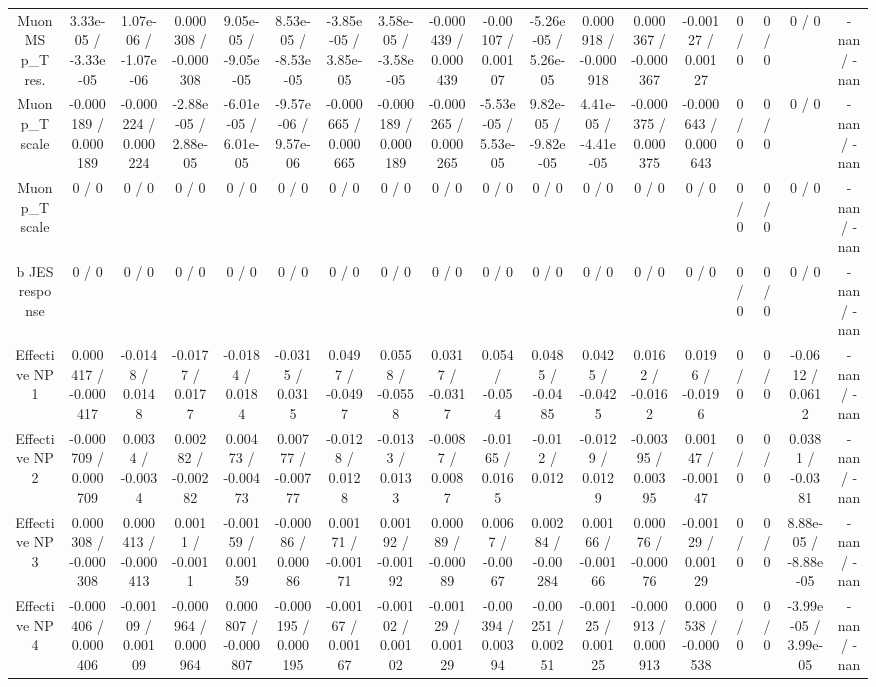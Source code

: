 \documentclass[10pt]{article}
\begin{document}
\begin{table}[htbp]
\begin{center}
\begin{tabular}{|c|c|c|c|c|c|c|c|c|c|c|c|c|c|c|c|c|c|}
  Muon MS p_{T} res. & 3.33e-05 / -3.33e-05 & 1.07e-06 / -1.07e-06 & 0.000308 / -0.000308 & 9.05e-05 / -9.05e-05 & 8.53e-05 / -8.53e-05 & -3.85e-05 / 3.85e-05 & 3.58e-05 / -3.58e-05 & -0.000439 / 0.000439 & -0.00107 / 0.00107 & -5.26e-05 / 5.26e-05 & 0.000918 / -0.000918 & 0.000367 / -0.000367 & -0.00127 / 0.00127 & 0 / 0 & 0 / 0 & 0 / 0 & -nan / -nan \\ 
  Muon p_{T} scale & -0.000189 / 0.000189 & -0.000224 / 0.000224 & -2.88e-05 / 2.88e-05 & -6.01e-05 / 6.01e-05 & -9.57e-06 / 9.57e-06 & -0.000665 / 0.000665 & -0.000189 / 0.000189 & -0.000265 / 0.000265 & -5.53e-05 / 5.53e-05 & 9.82e-05 / -9.82e-05 & 4.41e-05 / -4.41e-05 & -0.000375 / 0.000375 & -0.000643 / 0.000643 & 0 / 0 & 0 / 0 & 0 / 0 & -nan / -nan \\ 
  Muon p_{T} scale & 0 / 0 & 0 / 0 & 0 / 0 & 0 / 0 & 0 / 0 & 0 / 0 & 0 / 0 & 0 / 0 & 0 / 0 & 0 / 0 & 0 / 0 & 0 / 0 & 0 / 0 & 0 / 0 & 0 / 0 & 0 / 0 & -nan / -nan \\ 
  b JES response & 0 / 0 & 0 / 0 & 0 / 0 & 0 / 0 & 0 / 0 & 0 / 0 & 0 / 0 & 0 / 0 & 0 / 0 & 0 / 0 & 0 / 0 & 0 / 0 & 0 / 0 & 0 / 0 & 0 / 0 & 0 / 0 & -nan / -nan \\ 
  Effective NP 1 & 0.000417 / -0.000417 & -0.0148 / 0.0148 & -0.0177 / 0.0177 & -0.0184 / 0.0184 & -0.0315 / 0.0315 & 0.0497 / -0.0497 & 0.0558 / -0.0558 & 0.0317 / -0.0317 & 0.054 / -0.054 & 0.0485 / -0.0485 & 0.0425 / -0.0425 & 0.0162 / -0.0162 & 0.0196 / -0.0196 & 0 / 0 & 0 / 0 & -0.0612 / 0.0612 & -nan / -nan \\ 
  Effective NP 2 & -0.000709 / 0.000709 & 0.0034 / -0.0034 & 0.00282 / -0.00282 & 0.00473 / -0.00473 & 0.00777 / -0.00777 & -0.0128 / 0.0128 & -0.0133 / 0.0133 & -0.0087 / 0.0087 & -0.0165 / 0.0165 & -0.012 / 0.012 & -0.0129 / 0.0129 & -0.00395 / 0.00395 & 0.00147 / -0.00147 & 0 / 0 & 0 / 0 & 0.0381 / -0.0381 & -nan / -nan \\ 
  Effective NP 3 & 0.000308 / -0.000308 & 0.000413 / -0.000413 & 0.0011 / -0.0011 & -0.00159 / 0.00159 & -0.00086 / 0.00086 & 0.00171 / -0.00171 & 0.00192 / -0.00192 & 0.00089 / -0.00089 & 0.0067 / -0.0067 & 0.00284 / -0.00284 & 0.00166 / -0.00166 & 0.00076 / -0.00076 & -0.00129 / 0.00129 & 0 / 0 & 0 / 0 & 8.88e-05 / -8.88e-05 & -nan / -nan \\ 
  Effective NP 4 & -0.000406 / 0.000406 & -0.00109 / 0.00109 & -0.000964 / 0.000964 & 0.000807 / -0.000807 & -0.000195 / 0.000195 & -0.00167 / 0.00167 & -0.00102 / 0.00102 & -0.00129 / 0.00129 & -0.00394 / 0.00394 & -0.00251 / 0.00251 & -0.00125 / 0.00125 & -0.000913 / 0.000913 & 0.000538 / -0.000538 & 0 / 0 & 0 / 0 & -3.99e-05 / 3.99e-05 & -nan / -nan \\ 

\end{tabular}
\end{center}
\end{table}
\end{document}
